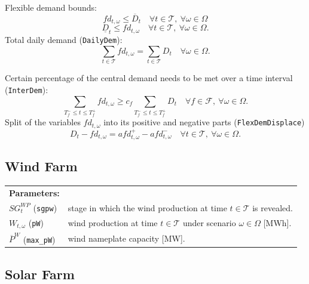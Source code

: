 Flexible demand bounds:
\begin{equation} \label{EQ:FlexDemand_UB_preliminary1}
	fd_{t, \omega} \leq \overline{D}_t \quad \forall t \in \mathcal{T}, \ \forall \omega \in \Omega
\end{equation} 
\begin{equation} \label{EQ:FlexDemand_LB_preliminary1}
	\underline{D}_t \leq fd_{t, \omega} \quad \forall t \in \mathcal{T}, \ \forall \omega \in \Omega.
\end{equation}
Total daily demand (\verb|DailyDem|): 
\begin{equation} \label{EQ:DailyDem1}
	\sum_{t \in \mathcal{T}} fd_{t, \omega} = \sum_{t \in \mathcal{T}} D_t \quad \forall \omega \in \Omega.
\end{equation}

Certain percentage of the central demand needs to be met over a time interval (\verb|InterDem|):
\begin{equation} \label{EQ:InterDem1}
	\sum_{T_f^- \leq t \leq T_f^+} fd_{t, \omega} \geq c_f \sum_{T_f^- \leq t \leq T_f^+} D_t \quad \forall f \in \mathcal{F}, \ \forall \omega \in \Omega.
\end{equation}
Split of the variables $fd_{t, \omega}$ into its positive and negative parts (\verb|FlexDemDisplace|)
\begin{equation} \label{EQ:FlexDemDisplace1}
	D_t - fd_{t, \omega} = afd_{t, \omega}^+ - afd_{t, \omega}^- \quad \forall t \in \mathcal{T}, \ \forall \omega \in \Omega.
\end{equation}

\subsection{Wind Farm}
\label{SEC:WindFarm1}

\begin{tabularx}{\textwidth}{l X}
    
    \textbf{Parameters:} \\
	$SG^{WP}_t$ (\texttt{sgpw}) & stage in which the wind production at time $t \in \mathcal{T}$ is revealed. \\
	$W_{t, \omega}$ (\texttt{pW}) & wind production at time $t \in \mathcal{T}$ under scenario $\omega \in \Omega$ [MWh]. \\
	$\overline{P}^W$ (\texttt{max\_pW}) & wind nameplate capacity [MW]. \\
\end{tabularx}

\subsection{Solar Farm}
\label{SEC:SolarFarm1}

